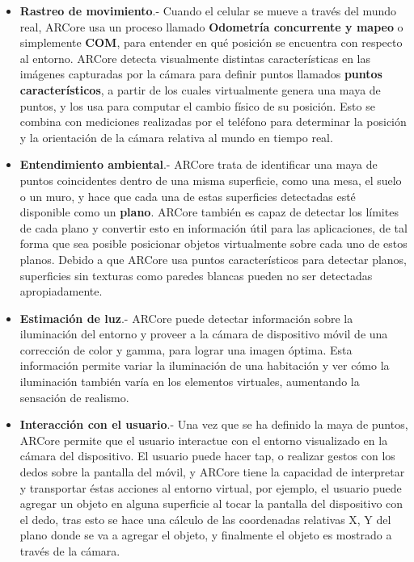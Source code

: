 \begin{itemize}
	\item \textbf{Rastreo de movimiento}.- Cuando el celular se mueve a través del mundo real, ARCore usa un proceso llamado \textbf{Odometría concurrente y mapeo} o simplemente \textbf{COM}, para entender en qué posición se encuentra con respecto al entorno. ARCore detecta visualmente distintas características en las imágenes capturadas por la cámara para definir puntos llamados \textbf{puntos característicos}, a partir de los cuales virtualmente genera una maya de puntos, y los usa para computar el cambio físico de su posición. Esto se combina con mediciones realizadas por el teléfono para determinar la posición y la orientación de la cámara relativa al mundo en tiempo real.
	
	\item \textbf{Entendimiento ambiental}.- ARCore trata de identificar una maya de puntos coincidentes dentro de una misma superficie, como una mesa, el suelo o un muro, y hace que cada una de estas superficies detectadas esté disponible como un \textbf{plano}. ARCore también es capaz de detectar los límites de cada plano y convertir esto en información útil para las aplicaciones, de tal forma que sea posible posicionar objetos virtualmente sobre cada uno de estos planos. Debido a que ARCore usa puntos característicos para detectar planos, superficies sin texturas como paredes blancas pueden no ser detectadas apropiadamente.
	
	\item \textbf{Estimación de luz}.- ARCore puede detectar información sobre la iluminación del entorno y proveer a la cámara de dispositivo móvil de una corrección de color y gamma, para lograr una imagen óptima. Esta información permite variar la iluminación de una habitación y ver cómo la iluminación también varía en los elementos virtuales, aumentando la sensación de realismo.
	
	\item \textbf{Interacción con el usuario}.- Una vez que se ha definido la maya de puntos, ARCore permite que el usuario interactue con el entorno visualizado en la cámara del dispositivo. El usuario puede hacer tap, o realizar gestos con los dedos sobre la pantalla del móvil, y ARCore tiene la capacidad de interpretar y transportar éstas acciones al entorno virtual, por ejemplo, el usuario puede agregar un objeto en alguna superficie al tocar la pantalla del dispositivo con el dedo, tras esto se hace una cálculo de las coordenadas relativas X, Y del plano donde se va a agregar el objeto, y finalmente el objeto es mostrado a través de la cámara.
	

\end{itemize}
